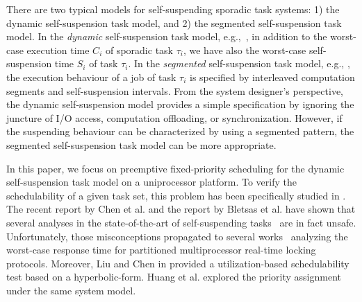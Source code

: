 There are two typical models for self-suspending sporadic task
systems: 1) the dynamic self-suspension task model, and 2) the
segmented self-suspension task model. In the \emph{dynamic}
self-suspension task model, e.g.,~\cite{ECRTS-AudsleyB04,RTAS-AudsleyB04,RTCSA-KimCPKH95,MingLiRTCSA1994,LiuChen:rtss2014,Huang_2015,ecrts16-techreport}, in addition to the worst-case execution time
$C_i$ of sporadic task $\tau_i$, we have also the worst-case
self-suspension time $S_i$ of task $\tau_i$. In the \emph{segmented} self-suspension
task model, e.g., \cite{RTCSA-BletsasA05,Kim2016,WC16-suspend-DATE,RTSS-ChenL14,Huang:multiseg,PH:rtss98}, the execution behaviour of a job of task $\tau_i$ is
specified by interleaved computation segments and self-suspension
intervals.  From the system designer's perspective, the dynamic
self-suspension model provides a simple specification by ignoring the
juncture of I/O access, computation offloading, or
synchronization. However, if the suspending behaviour can be
characterized by using a segmented pattern, the segmented
self-suspension task model can be more appropriate.

In this paper, we focus on preemptive fixed-priority scheduling for
the dynamic self-suspension task model on a uniprocessor platform. To
verify the schedulability of a given task set, this problem has been
specifically studied in
\cite{RTCSA-KimCPKH95,MingLiRTCSA1994,ECRTS-AudsleyB04,RTAS-AudsleyB04,Huang_2015}.
The recent report by Chen et al. \cite{suspension-review-jj}
 and the report by Bletsas et al. \cite{BletsasReport2015}
have shown that several analyses in the state-of-the-art of self-suspending tasks~\cite{ECRTS-AudsleyB04,RTAS-AudsleyB04,RTCSA-KimCPKH95,MingLiRTCSA1994}
are in fact unsafe. Unfortunately, those misconceptions propagated to several works~\cite{zeng-2011,bbb-2013,yang-2013,kim-2014,han-2014,carminati-2014,yang-2014,lakshmanan-2009}
analyzing the worst-case response time for partitioned multiprocessor
real-time locking protocols. Moreover, Liu and Chen
in \cite{LiuChen:rtss2014} provided a utilization-based schedulability
test based on a hyperbolic-form. Huang et al. \cite{Huang_2015}
explored the priority assignment under the same system model.

